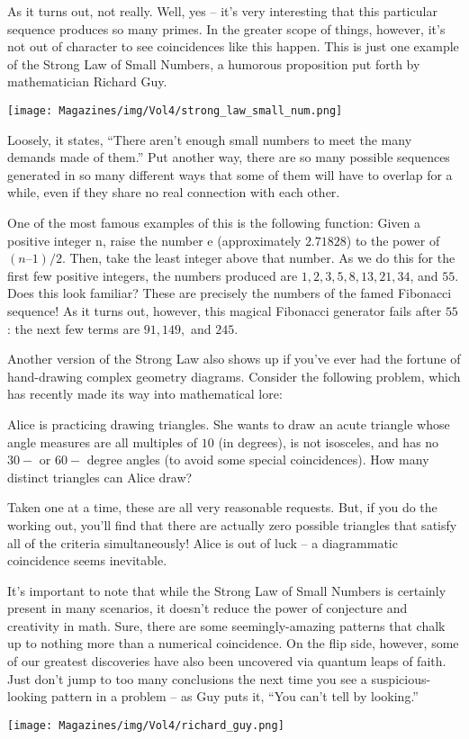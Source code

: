 \documentclass{article}
\begin{document}
\begin{multicols}{3}
As it turns out, not really. Well, yes – it’s very interesting that this particular sequence produces so many primes. In the greater scope of things, however, it’s not out of character to see coincidences like this happen. This is just one example of the Strong Law of Small Numbers, a humorous proposition put forth by mathematician Richard Guy. 

\begin{center}
\texttt{[image: Magazines/img/Vol4/strong\_law\_small\_num.png]}
\end{center}
 
Loosely, it states, “There aren’t enough small numbers to meet the many demands made of them.” Put another way, there are so many possible sequences generated in so many different ways that some of them will have to overlap for a while, even if they share no real connection with each other.
	
One of the most famous examples of this is the following function: Given a positive integer n, raise the number e (approximately $2.71828$) to the power of $(n – 1)/2$. Then, take the least integer above that number. As we do this for the first few positive integers, the numbers produced are $1, 2, 3, 5, 8, 13, 21, 34$, and $55$. Does this look familiar? These are precisely the numbers of the famed Fibonacci sequence! As it turns out, however, this magical Fibonacci generator fails after $55$: the next few terms are $91, 149,$ and $245$.

Another version of the Strong Law also shows up if you’ve ever had the fortune of hand-drawing complex geometry diagrams. Consider the following problem, which has recently made its way into mathematical lore:

Alice is practicing drawing triangles. She wants to draw an acute triangle whose angle measures are all multiples of $10$ (in degrees), is not isosceles, and has no $30-$ or $60-$ degree angles (to avoid some special coincidences). How many distinct triangles can Alice draw?
 
Taken one at a time, these are all very reasonable requests. But, if you do the working out, you’ll find that there are actually zero possible triangles that satisfy all of the criteria simultaneously! Alice is out of luck – a diagrammatic coincidence seems inevitable.

It’s important to note that while the Strong Law of Small Numbers is certainly present in many scenarios, it doesn’t reduce the power of conjecture and creativity in math. Sure, there are some seemingly-amazing patterns that chalk up to nothing more than a numerical coincidence. On the flip side, however, some of our greatest discoveries have also been uncovered via quantum leaps of faith. Just don’t jump to too many conclusions the next time you see a suspicious-looking pattern in a problem – as Guy puts it, “You can’t tell by looking.” 
\begin{center}
\texttt{[image: Magazines/img/Vol4/richard\_guy.png]}
\end{center}


\end{multicols}
\end{document}

